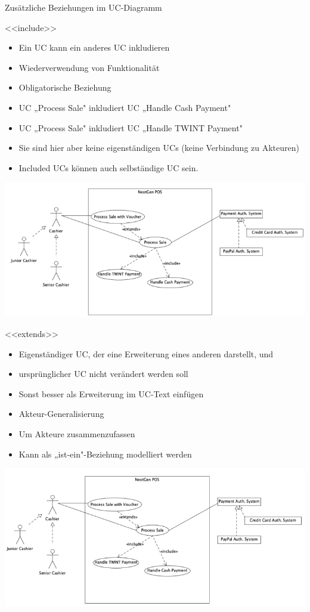 \begin{concept}
    {Zusätzliche Beziehungen im UC-Diagramm}

    <<include>>
    \begin{itemize}
        \item Ein UC kann ein anderes UC inkludieren
        \item Wiederverwendung von Funktionalität
        \item Obligatorische Beziehung
        \item UC „Process Sale" inkludiert UC „Handle Cash Payment"
        \item UC „Process Sale" inkludiert UC „Handle TWINT Payment"
        \item Sie sind hier aber keine eigenständigen UCs (keine Verbindung zu Akteuren)
        \item Included UCs können auch selbständige UC sein.
    \end{itemize}
    \includegraphics[width=\linewidth]{includebez.png}

    <<extends>>
    \begin{itemize}
        \item Eigenständiger UC, der eine Erweiterung eines anderen darstellt, und
        \item ursprünglicher UC nicht verändert werden soll
        \item Sonst besser als Erweiterung im UC-Text einfügen
        \item Akteur-Generalisierung
        \item Um Akteure zusammenzufassen
        \item Kann als „ist-ein"-Beziehung modelliert werden
    \end{itemize}
    \includegraphics[width=\linewidth]{extendbez.png}
\end{concept}


